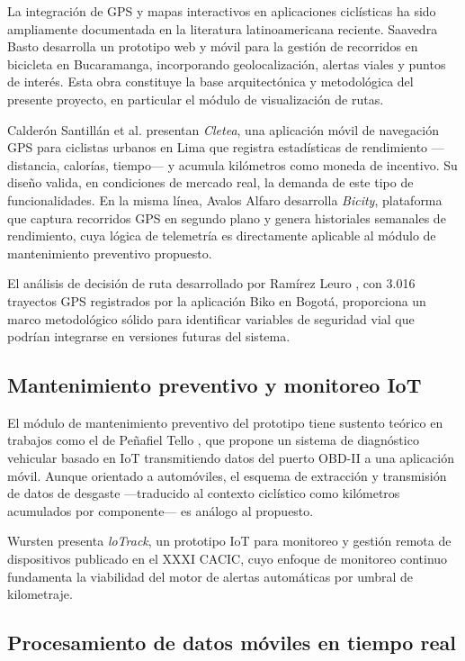 \documentclass{llncs}
\begin{document}
La integración de GPS y mapas interactivos en aplicaciones ciclísticas ha sido ampliamente documentada en la literatura latinoamericana reciente. Saavedra Basto \cite{Saavedra2022} desarrolla un prototipo web y móvil para la gestión de recorridos en bicicleta en Bucaramanga, incorporando geolocalización, alertas viales y puntos de interés. Esta obra constituye la base arquitectónica y metodológica del presente proyecto, en particular el módulo de visualización de rutas.

Calderón Santillán et al. \cite{Calderon2022} presentan \textit{Cletea}, una aplicación móvil de navegación GPS para ciclistas urbanos en Lima que registra estadísticas de rendimiento —distancia, calorías, tiempo— y acumula kilómetros como moneda de incentivo. Su diseño valida, en condiciones de mercado real, la demanda de este tipo de funcionalidades. En la misma línea, Avalos Alfaro \cite{Avalos2021} desarrolla \textit{Bicity}, plataforma que captura recorridos GPS en segundo plano y genera historiales semanales de rendimiento, cuya lógica de telemetría es directamente aplicable al módulo de mantenimiento preventivo propuesto.

El análisis de decisión de ruta desarrollado por Ramírez Leuro \cite{Ramirez2021}, con 3.016 trayectos GPS registrados por la aplicación Biko en Bogotá, proporciona un marco metodológico sólido para identificar variables de seguridad vial que podrían integrarse en versiones futuras del sistema.

\subsection{Mantenimiento preventivo y monitoreo IoT}

El módulo de mantenimiento preventivo del prototipo tiene sustento teórico en trabajos como el de Peñafiel Tello \cite{Penafiel2018}, que propone un sistema de diagnóstico vehicular basado en IoT transmitiendo datos del puerto OBD-II a una aplicación móvil. Aunque orientado a automóviles, el esquema de extracción y transmisión de datos de desgaste —traducido al contexto ciclístico como kilómetros acumulados por componente— es análogo al propuesto.

Wursten \cite{Wursten2025} presenta \textit{loTrack}, un prototipo IoT para monitoreo y gestión remota de dispositivos publicado en el XXXI CACIC, cuyo enfoque de monitoreo continuo fundamenta la viabilidad del motor de alertas automáticas por umbral de kilometraje.

\subsection{Procesamiento de datos móviles en tiempo real}
\end{document}
